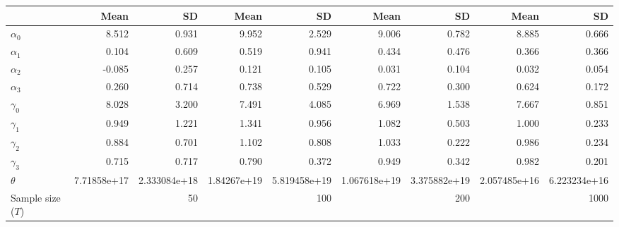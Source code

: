 
\begin{tabular}[t]{lrrrrrrrr}
\toprule
  & Mean & SD & Mean  & SD  & Mean   & SD   & Mean    & SD   \\
\midrule
$\alpha_{0}$ & 8.512 & 0.931 & 9.952 & 2.529 & 9.006 & 0.782 & 8.885 & 0.666\\
$\alpha_{1}$ & 0.104 & 0.609 & 0.519 & 0.941 & 0.434 & 0.476 & 0.366 & 0.366\\
$\alpha_{2}$ & -0.085 & 0.257 & 0.121 & 0.105 & 0.031 & 0.104 & 0.032 & 0.054\\
$\alpha_{3}$ & 0.260 & 0.714 & 0.738 & 0.529 & 0.722 & 0.300 & 0.624 & 0.172\\
$\gamma_{0}$ & 8.028 & 3.200 & 7.491 & 4.085 & 6.969 & 1.538 & 7.667 & 0.851\\
$\gamma_{1}$ & 0.949 & 1.221 & 1.341 & 0.956 & 1.082 & 0.503 & 1.000 & 0.233\\
$\gamma_{2}$ & 0.884 & 0.701 & 1.102 & 0.808 & 1.033 & 0.222 & 0.986 & 0.234\\
$\gamma_{3}$ & 0.715 & 0.717 & 0.790 & 0.372 & 0.949 & 0.342 & 0.982 & 0.201\\
$\theta$ & 7.71858e+17 & 2.333084e+18 & 1.84267e+19 & 5.819458e+19 & 1.067618e+19 & 3.375882e+19 & 2.057485e+16 & 6.223234e+16\\
Sample size ($T$) &  & 50 &  & 100 &  & 200 &  & 1000\\
\bottomrule
\end{tabular}
